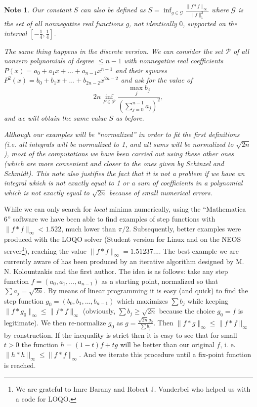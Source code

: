 \documentclass[12pt]{amsart}
\newtheorem{note}[theorem]{Note}
\theoremstyle{definition}
\begin{document}
\begin{note}
Our constant $S$  can also be defined as $S = \inf_{g \in \mathcal
G} \frac {\|f \ast f\|_{\infty}}{\|f\|_1^2}$ where
 $\mathcal G$ is the set of all nonnegative real functions
$g$, not identically $0$, supported on the interval
$[-\frac{1}{4}, \frac{1}{4}]$.

The same thing  happens in the discrete version. We can consider
the set $\mathcal P$ of all nonzero polynomials of degree $\le
n-1$ with nonnegative real coefficients $P(x) = a_0 + a_1x + \dots
+ a_{n-1}x^{n-1}$ and their squares $P^2(x) = b_0 + b_1x + \dots +
b_{2n-2}x^{2n-2}$ and ask for the value of
\begin{equation}\label{masikdef}2 n
\inf_{P \in \mathcal P} \frac{\max_j b_j}{\left( \sum_{j=0}^{n-1}
a_j \right)^2},\end{equation} and we will obtain the same value
$S$ as before.

Although our examples  will be ``normalized'' in order to fit the
first definitions (i.e. all integrals will be normalized to 1, and
all sums will be normalized to $\sqrt{2n}$), most of the
computations we have been carried out using these other ones
(which are more convenient and closer to the ones given by
Schinzel and Schmidt). This note also justifies the fact that it
is not a problem if we have an integral which is not exactly equal
to 1 or a sum of coefficients in a polynomial which is not exactly
equal to $\sqrt{2n}$ because of small numerical errors.
\end{note}

While we can only search for {\it local} minima numerically, using
the ``Mathematica 6'' software we have been able to find examples
of step functions with $\|f \ast f\|_{\infty} < 1.522$, much lower
than $\pi/2$. Subsequently, better examples were produced with the LOQO
solver (Student version for Linux and on the NEOS
server\footnote{We are grateful to Imre Barany and Robert J.
Vanderbei who helped us with a code for LOQO.}), reaching the
value $\|f \ast f\|_{\infty}=1.51237...$. The best example we are
currently aware of has been produced by an iterative algorithm
designed by M. N. Kolountzakis and the first author. The idea is as
follows: take any step function $f=(a_0, a_1, \dots, a_{n-1})$ as a
starting point, normalized so that $\sum a_j=\sqrt{2n}$. By means
of linear programming it is easy (and quick) to find the step
function $g_0=(b_0, b_1, \dots, b_{n-1})$ which maximizes $\sum
b_j$ while keeping $\|f\ast g_0\|_\infty \le \|f\ast f\|_\infty$
(obviously, $\sum b_j\ge \sqrt{2n}$ because the choice $g_0=f$ is
legitimate). We then re-normalize $g_0$ as
$g=\frac{\sqrt{2n}g_0}{\sum b_j}$. Then $\|f\ast g\|_\infty \le
\|f\ast f\|_\infty$ by construction. If the inequality is strict
then it is easy to see that for small $t>0$ the function
$h=(1-t)f+tg$ will be better than our original $f$, i. e. $\|h\ast
h\|_\infty \le \|f\ast f\|_\infty$. And we iterate this procedure
until a fix-point function is reached.
\end{document}
